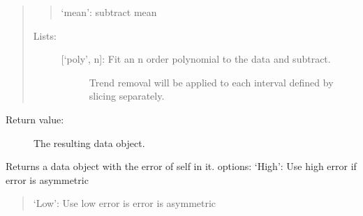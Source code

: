\documentclass[letterpaper,10pt,english]{sphinxmanual}
\begin{document}
\begin{fulllineitems}
\begin{quote}
\begin{description}
\begin{description}
\begin{quote}
‘mean’: subtract mean
\end{quote}
\begin{description}
\item[{Lists:}] \leavevmode\begin{description}
\item[{{[}‘poly’, n{]}: Fit an n order polynomial to the data and subtract.}] \leavevmode
Trend removal will be applied to each interval defined by slicing
separately.

\end{description}

\end{description}

\end{description}

\end{description}
\end{quote}
\begin{description}
\item[{Return value:}] \leavevmode
The resulting data object.

\end{description}

\end{fulllineitems}


\begin{fulllineitems}
\label{\detokenize{data_object:flap.data_object.error_value}}
Returns a data object with the error of self in it.
options: ‘High’: Use high error if error is asymmetric
\begin{quote}

‘Low’: Use low error is error is asymmetric
\end{quote}

\end{fulllineitems}

\end{document}

